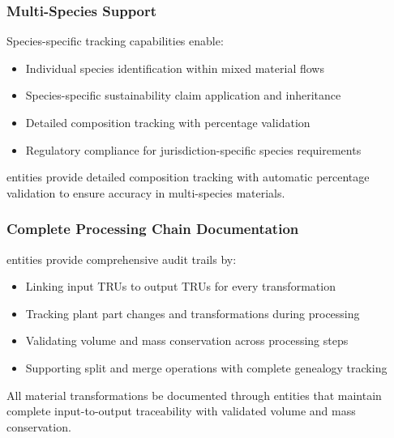 \subsubsection{Multi-Species Support}
\label{sec:multi-species-support}

Species-specific tracking capabilities enable:

\begin{itemize}
    \item Individual species identification within mixed material flows
    \item Species-specific sustainability claim application and inheritance
    \item Detailed composition tracking with percentage validation
    \item Regulatory compliance for jurisdiction-specific species requirements
\end{itemize}

\begin{informative}[title=Species Composition Validation]
 entities provide detailed composition tracking with automatic percentage validation to ensure accuracy in multi-species materials.
\end{informative}

\subsubsection{Complete Processing Chain Documentation}
\label{sec:processing-chain-documentation}

 entities provide comprehensive audit trails by:

\begin{itemize}
    \item Linking input TRUs to output TRUs for every transformation
    \item Tracking plant part changes and transformations during processing
    \item Validating volume and mass conservation across processing steps
    \item Supporting split and merge operations with complete genealogy tracking
\end{itemize}

\begin{normative}[title=Processing Chain Requirements]
All material transformations \MUST{} be documented through  entities that maintain complete input-to-output traceability with validated volume and mass conservation.
\end{normative}